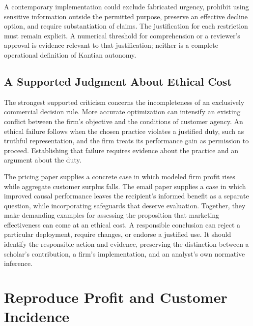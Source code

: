 A contemporary implementation could exclude fabricated urgency, prohibit
using sensitive information outside the permitted purpose, preserve an
effective decline option, and require substantiation of claims. The
justification for each restriction must remain explicit. A numerical
threshold for comprehension or a reviewer's approval is evidence
relevant to that justification; neither is a complete operational
definition of Kantian autonomy.

\hypertarget{M09-a-supported-judgment-about-ethical-cost}{%
\subsection{A Supported Judgment About Ethical
Cost}\label{M09-a-supported-judgment-about-ethical-cost}}

\noindent The strongest supported criticism concerns the incompleteness of an
exclusively commercial decision rule. More accurate optimization can
intensify an existing conflict between the firm's objective and the
conditions of customer agency. An ethical failure follows when the
chosen practice violates a justified duty, such as truthful
representation, and the firm treats its performance gain as permission
to proceed. Establishing that failure requires evidence about the
practice and an argument about the duty.

The pricing paper supplies a concrete case in which modeled firm profit
rises while aggregate customer surplus falls. The email paper supplies a
case in which improved causal performance leaves the recipient's
informed benefit as a separate question, while incorporating safeguards
that deserve evaluation. Together, they make demanding examples for
assessing the proposition that marketing effectiveness can come at an
ethical cost. A responsible conclusion can reject a particular
deployment, require changes, or endorse a justified use. It should
identify the responsible action and evidence, preserving the distinction
between a scholar's contribution, a firm's implementation, and an
analyst's own normative inference.


\hypertarget{M09-reproduce-profit-and-customer-incidence}{%
\section{Reproduce Profit and Customer
Incidence}\label{M09-reproduce-profit-and-customer-incidence}}

